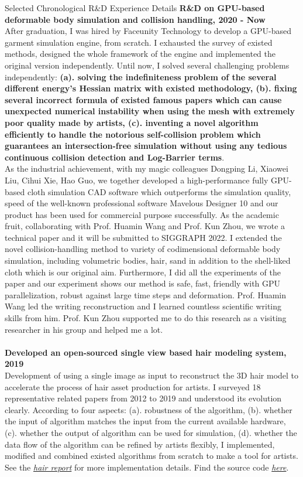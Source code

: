 \documentclass{resume} %
\begin{document}
\begin{rSection}{Selected Chronological R\&D Experience Details}
  {\bf R\&D on GPU-based deformable body simulation and collision handling, 2020 - Now}\\ After graduation, I was hired by Faceunity Technology to develop a GPU-based garment simulation engine, from scratch. I exhausted the survey of existed methods, designed the whole framework of the engine and implemented the original version independently. Until now, I solved several challenging problems independently:\textbf{ (a). solving the indefiniteness problem of the several different energy's Hessian matrix with existed methodology, (b). fixing several incorrect formula of existed famous papers which can cause unexpected numerical instability when using the mesh with extremely poor quality made by artists, (c). inventing a novel algorithm efficiently to handle the notorious self-collision problem which guarantees an intersection-free simulation without using any tedious continuous collision detection and Log-Barrier terms}.\\
  As the industrial achievement, with my magic colleagues Dongping Li, Xiaowei Liu, Cihui Xie, Hao Guo, we together developed a high-performance fully GPU-based cloth simulation CAD software which outperforms the simulation quality, speed of the well-known professional software Mavelous Designer 10 and our product has been used for commercial purpose successfully. As the academic fruit, collaborating with Prof. Huamin Wang and Prof. Kun Zhou, we wrote a technical paper and it will be submitted to SIGGRAPH 2022. I extended the novel collision-handling method to variety of codimensional deformable body simulation, including volumetric bodies, hair, sand in addition to the shell-liked cloth which is our original aim. Furthermore, I did all the experiments of the paper and our experiment shows our method is safe, fast, friendly with GPU parallelization, robust against large time steps and deformation. Prof. Huamin Wang led the writing reconstruction and I learned countless scientific writing skills from him. Prof. Kun Zhou supported me to do this research as a visiting researcher in his group and helped me a lot.\\
  \\{\bf Developed an open-sourced single view based hair modeling system, 2019}\\ Development of using a single image as input to reconstruct the 3D hair model to accelerate the process of hair asset production for artists. I surveyed 18 representative related papers from 2012 to 2019 and understood its evolution clearly. According to four aspects: (a). robustness of the algorithm, (b). whether the input of algorithm matches the input from the current available hardware, (c). whether the output of algorithm can be used for simulation, (d). whether the data flow of the algorithm can be refined by artists flexibly, I implemented, modified and combined existed algorithms from scratch to make a tool for artists. See the \emph{\href{https://wtyatzoo.github.io/reports/hair.pdf}{hair report}} for more implementation details. Find the source code \emph{\href{https://github.com/WTYatzoo/hair\_modeling}{here}}.\\

\end{rSection}
\end{document}
